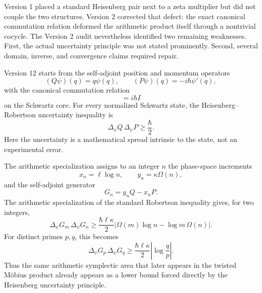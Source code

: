 \documentclass[11pt]{amsart}
\numberwithin{equation}{section}
\theoremstyle{plain}
\theoremstyle{definition}
\theoremstyle{remark}
\begin{document}
Version 1 placed a standard Heisenberg pair next to a zeta multiplier but did
not couple the two structures.  Version 2 corrected that defect: the exact
canonical commutation relation deformed the arithmetic product itself through
a nontrivial cocycle.  The Version 2 audit nevertheless identified two
remaining weaknesses.  First, the actual uncertainty principle was not stated
prominently.  Second, several domain, inverse, and convergence claims required
repair.

Version 12 starts from the self-adjoint position and momentum operators
\begin{equation}
(Q\psi)(q)=q\psi(q),
\qquad
(P\psi)(q)=-i\hbar\psi'(q),
\label{eq:intro_QP}
\end{equation}
with the canonical commutation relation
\begin{equation}
[Q,P]=i\hbar I
\label{eq:intro_CCR}
\end{equation}
on the Schwartz core.  For every normalized Schwartz state, the Heisenberg--Robertson uncertainty inequality is \cite{Robertson1929}
\begin{equation}
\boxed{\Delta_\psi Q\,\Delta_\psi P\ge\frac{\hbar}{2}.}
\label{eq:intro_heisenberg_uncertainty}
\end{equation}
Here the uncertainty is a mathematical spread intrinsic to the state, not an
experimental error.

The arithmetic specialization assigns to an integer \(n\) the phase-space
increments
\begin{equation}
x_n=\ell\log n,
\qquad
y_n=\kappa\Omega(n),
\label{eq:intro_phase_space_coordinates}
\end{equation}
and the self-adjoint generator
\begin{equation}
G_n=y_nQ-x_nP.
\label{eq:intro_Gn}
\end{equation}
The arithmetic specialization of the standard Robertson inequality gives, for two integers,
\begin{equation}
\boxed{
\Delta_\psi G_m\,\Delta_\psi G_n
\ge
\frac{\hbar\ell\kappa}{2}
\left|\Omega(m)\log n-\log m\,\Omega(n)\right|.}
\label{eq:intro_arithmetic_uncertainty}
\end{equation}
For distinct primes \(p,q\), this becomes
\begin{equation}
\boxed{
\Delta_\psi G_p\,\Delta_\psi G_q
\ge
\frac{\hbar\ell\kappa}{2}
\left|\log\frac{q}{p}\right|.}
\label{eq:intro_prime_uncertainty}
\end{equation}
Thus the same arithmetic symplectic area that later appears in the twisted
M\"obius product already appears as a lower bound forced directly by the
Heisenberg uncertainty principle.
\end{document}
